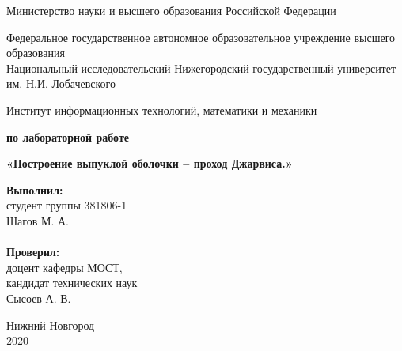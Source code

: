 \documentclass{report}
\begin{document}
\begin{titlepage}

\begin{center}
Министерство науки и высшего образования Российской Федерации
\end{center}

\begin{center}
Федеральное государственное автономное образовательное учреждение высшего образования \\
Национальный исследовательский Нижегородский государственный университет им. Н.И. Лобачевского
\end{center}

\begin{center}
Институт информационных технологий, математики и механики
\end{center}

\vspace{4em}

\begin{center}
\textbf{ по лабораторной работе} \\
\end{center}
\begin{center}
\textbf{\Large«Построение выпуклой оболочки – проход Джарвиса.»} \\
\end{center}

\vspace{4em}

\newbox{\lbox}
\newlength{\maxl}
\setlength{\maxl}{\wd\lbox}
\hfill\parbox{7cm}{
\hspace*{5cm}\hspace*{-5cm}\textbf{Выполнил:} \\ студент группы 381806-1 \\ Шагов М. А.\\
\\
\hspace*{5cm}\hspace*{-5cm}\textbf{Проверил:}\\ доцент кафедры МОСТ, \\ кандидат технических наук \\ Сысоев А. В.\\
}
\vspace{\fill}

\begin{center} Нижний Новгород \\ 2020 \end{center}

\end{titlepage}
\end{document}
